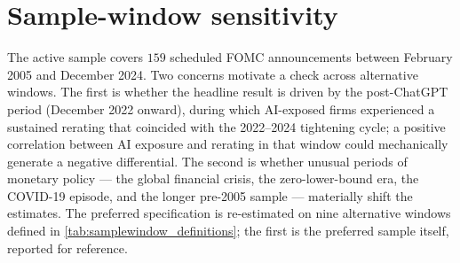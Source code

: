 \section{Sample-window sensitivity}
\label{sec:rob-samplewindows}

The active sample covers $159$ scheduled FOMC announcements between
February 2005 and December 2024. Two concerns motivate a check across
alternative windows. The first is whether the headline result is
driven by the post-ChatGPT period (December 2022 onward), during
which AI-exposed firms experienced a sustained rerating that
coincided with the 2022--2024 tightening cycle; a positive
correlation between AI exposure and rerating in that window could
mechanically generate a negative differential. The second is whether
unusual periods of monetary policy --- the global financial crisis,
the zero-lower-bound era, the COVID-19 episode, and the longer
pre-2005 sample --- materially shift the estimates. The preferred
specification is re-estimated on nine alternative windows defined in
\cref{tab:samplewindow_definitions}; the first is the preferred
sample itself, reported for reference.

\begin{table}[htbp]
\centering\small
\caption[Sample-window definitions]{Sample-window definitions}
\label{tab:samplewindow_definitions}

\end{table}

\begin{table}[htbp]
\centering\small
\caption[Sample-window sensitivity: High AI--No AI key-horizon
estimates]{Sample-window sensitivity: High AI--No AI key-horizon
estimates}
\label{tab:samplewindow_key}

\end{table}

